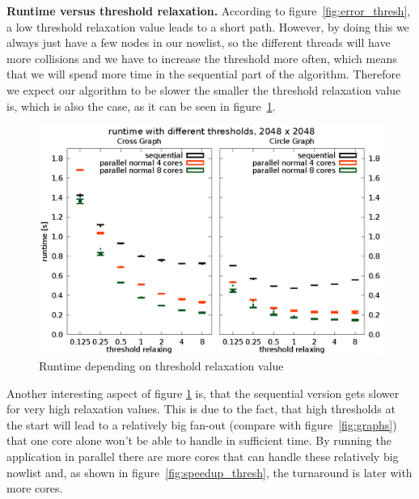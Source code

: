 \documentclass[letterpaper]{article}
\newcommand{\mypar}[1]{{\bf #1.}}
\begin{document}
\mypar{Runtime versus threshold relaxation}
According to figure~\ref{fig:error_thresh}, a low threshold relaxation value leads to a short path. However, by doing this we always just have a few nodes in our nowlist, so the different threads will have more collisions and we have to increase the threshold more often, which means that we will spend more time in the sequential part of the algorithm. Therefore we expect our algorithm to be slower the smaller the threshold relaxation value is, which is also the case, as it can be seen in figure~\ref{fig:runtime_thresh}.\\
\begin{figure}[h]\centering
  \includegraphics[scale=0.558]{runtime_threshold.eps}
  \caption{Runtime depending on threshold relaxation value\label{fig:runtime_thresh}}
\end{figure}
Another interesting aspect of figure \ref{fig:runtime_thresh} is, that the sequential version gets slower for very high relaxation values. This is due to the fact, that high thresholds at the start will lead to a relatively big fan-out (compare with figure~\ref{fig:graphs}) that one core alone won't be able to handle in sufficient time. By running the application in parallel there are more cores that can handle these relatively big nowlist and, as shown in figure~\ref{fig:speedup_thresh}, the turnaround is later with more cores.
\end{document}

